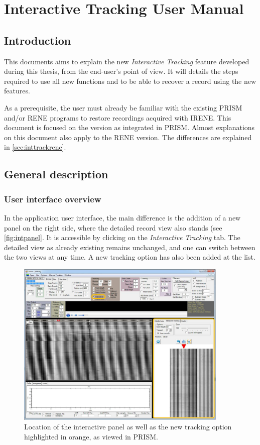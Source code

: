 
\chapter{Interactive Tracking User Manual}
\label{chap:usermanint}

\section{Introduction}

This documents aims to explain the new \emph{Interactive Tracking} feature developed during this thesis, from the end-user's point of view. It will details the steps required to use all new functions and to be able to recover a record using the new features.

As a prerequisite, the user must already be familiar with the existing PRISM and/or RENE programs to restore recordings acquired with IRENE. This document is focused on the version as integrated in PRISM. Almost explanations on this document also apply to the RENE version. The differences are explained in \autoref{sec:inttrackrene}.

\section{General description}

\subsection{User interface overview}

In the application user interface, the main difference is the addition of a new panel on the right side, where the detailed record view also stands (see \autoref{fig:intpanel}. It is accessible by clicking on the \emph{Interactive Tracking} tab. The detailed view as already existing remains unchanged, and one can switch between the two views at any time. A new tracking option has also been added at the list.

\begin{figure}[!ht]
\centering
\includegraphics[width=0.9\textwidth]{images/int-right-panel}
\caption[Location of the interactive panel in PRISM.]
{Location of the interactive panel as well as the new tracking option highlighted in orange, as viewed in PRISM.}
\label{fig:intpanel}
\end{figure}

